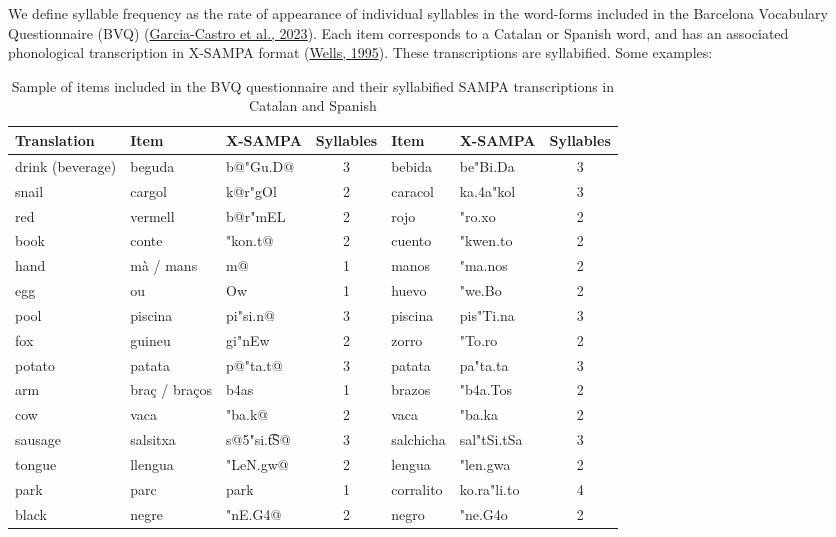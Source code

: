 \documentclass[
]{article}
\begin{document}
We define syllable frequency as the rate of appearance of individual
syllables in the word-forms included in the Barcelona Vocabulary
Questionnaire (BVQ)
(\protect\hyperlink{ref-garcia-castro2023bvq}{Garcia-Castro et al.,
2023}). Each item corresponds to a Catalan or Spanish word, and has an
associated phonological transcription in X-SAMPA format
(\protect\hyperlink{ref-wells1995computercoding}{Wells, 1995}). These
transcriptions are syllabified. Some examples:

\hypertarget{tbl-syll-items}{}
\begin{table}
\caption{\label{tbl-syll-items}Sample of items included in the BVQ questionnaire and their syllabified
SAMPA transcriptions in Catalan and Spanish }\tabularnewline

\centering
\begin{tabular}{lllcllc}
\toprule
Translation & Item & X-SAMPA & Syllables & Item & X-SAMPA & Syllables\\
\midrule
drink (beverage) & beguda & b@"Gu.D@ & 3 & bebida & be"Bi.Da & 3\\
snail & cargol & k@r"gOl & 2 & caracol & ka.4a"kol & 3\\
red & vermell & b@r"mEL & 2 & rojo & "ro.xo & 2\\
book & conte & "kon.t@ & 2 & cuento & "kwen.to & 2\\
hand & mà / mans & m@ & 1 & manos & "ma.nos & 2\\
\addlinespace
egg & ou & Ow & 1 & huevo & "we.Bo & 2\\
pool & piscina & pi"si.n@ & 3 & piscina & pis"Ti.na & 3\\
fox & guineu & gi"nEw & 2 & zorro & "To.ro & 2\\
potato & patata & p@"ta.t@ & 3 & patata & pa"ta.ta & 3\\
arm & braç / braços & b4as & 1 & brazos & "b4a.Tos & 2\\
\addlinespace
cow & vaca & "ba.k@ & 2 & vaca & "ba.ka & 2\\
sausage & salsitxa & s@5"si.t͡S@ & 3 & salchicha & sal"tSi.tSa & 3\\
tongue & llengua & "LeN.gw@ & 2 & lengua & "len.gwa & 2\\
park & parc & park & 1 & corralito & ko.ra"li.to & 4\\
black & negre & "nE.G4@ & 2 & negro & "ne.G4o & 2\\
\bottomrule
\end{tabular}
\end{table}
\end{document}
